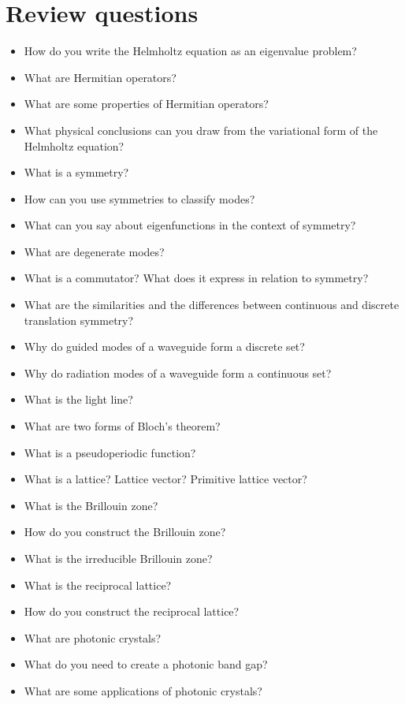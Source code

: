 \section*{Review questions}

\begin{itemize}
\item How do you write the Helmholtz equation as an eigenvalue problem?
\item What are Hermitian operators?
\item What are some properties of Hermitian operators?
\item What physical conclusions can you draw from the variational form of the Helmholtz equation?
\item What is a symmetry?
\item How can you use symmetries to classify modes?
\item What can you say about eigenfunctions in the context of symmetry? 
\item What are degenerate modes?
\item What is a commutator? What does it express in relation to symmetry?
\item What are the similarities and the differences between continuous and discrete translation symmetry?
\item Why do guided modes of a waveguide form a discrete set?  
\item Why do radiation modes of a waveguide form a continuous set?
\item What is the light line?
\item What are two forms of Bloch's theorem?
\item What is a pseudoperiodic function?
\item What is a lattice? Lattice vector? Primitive lattice vector?
\item What is the Brillouin zone?
\item How do you construct the Brillouin zone?  
\item What is the irreducible Brillouin zone?  
\item What is the reciprocal lattice?
\item How do you construct the reciprocal lattice?
\item What are photonic crystals?
\item What do you need to create a photonic band gap?  
\item What are some applications of photonic crystals?  
\end{itemize}

\pagebreak




